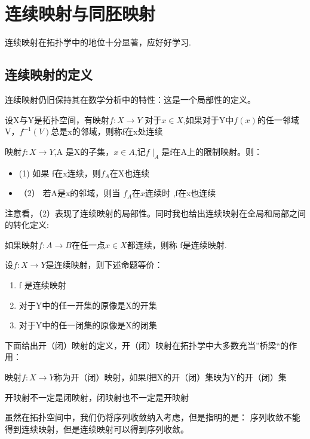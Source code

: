 \section{连续映射与同胚映射}
连续映射在拓扑学中的地位十分显著，应好好学习.
\subsection*{连续映射的定义}
连续映射仍旧保持其在数学分析中的特性：这是一个局部性的定义。
\begin{definition}
    设X与Y是拓扑空间，有映射\(f:X\rightarrow Y\) 对于\(x\in X \),如果对于Y中\(f(x)\)的任一邻域V，\(f^{-1}(V)\)总是x的邻域，则称f在x处连续
\end{definition}
\begin{corollary}\label{C:1}
    映射\(f:X\rightarrow Y\),A 是X的子集，\(x \in A \),记\(f\mid_A\)是f在A上的限制映射。则： 
    \begin{itemize}
        \item(1) 如果 f在x连续，则\(f_A\)在X也连续\\
         \item （2） 若A是x的邻域，则当 \(f_A在x\)连续时 ,f在x也连续
    \end{itemize}
\end{corollary}
注意看，（2）表现了连续映射的局部性。同时我也给出连续映射在全局和局部之间的转化定义: 
\begin{definition}
    如果映射\(f: A \rightarrow B \)在任一点\(x \in X \)都连续，则称 f是连续映射.
\end{definition}
\begin{theorem}
    设\(f: X \rightarrow Y \)是连续映射，则下述命题等价： 
    \begin{enumerate}
        \item f 是连续映射  \\
        \item 对于Y中的任一开集的原像是X的开集 \\
        \item 对于Y中的任一闭集的原像是X的闭集
    \end{enumerate}
\end{theorem}
下面给出开（闭）映射的定义，开（闭）映射在拓扑学中大多数充当”桥梁“的作用：
\begin{definition}
    映射\(f: X \rightarrow Y \)称为开（闭）映射，如果f把X的开（闭）集映为Y的开（闭）集    
\end{definition}
\begin{note}
    开映射不一定是闭映射，闭映射也不一定是开映射
\end{note}
\begin{note}
    虽然在拓扑空间中，我们仍将序列收敛纳入考虑，但是指明的是： 序列收敛不能得到连续映射，但是连续映射可以得到序列收敛。
\end{note}
